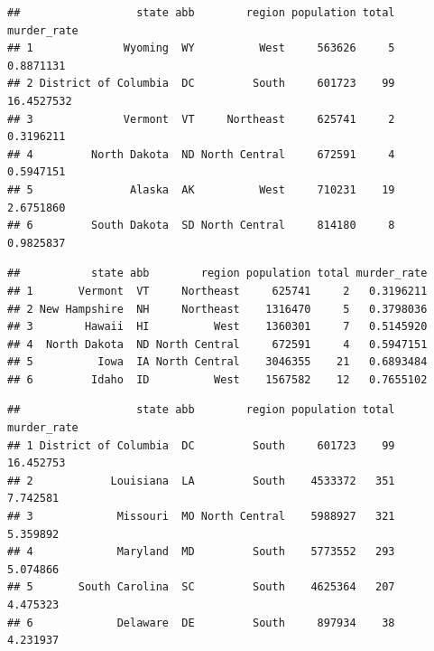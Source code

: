 \documentclass[
]{article}
\newenvironment{Shaded}{\begin{snugshade}}{\end{snugshade}}
\newcommand{\CommentTok}[1]{\textcolor[rgb]{0.56,0.35,0.01}{\textit{#1}}}
\newcommand{\KeywordTok}[1]{\textcolor[rgb]{0.13,0.29,0.53}{\textbf{#1}}}
\newcommand{\NormalTok}[1]{#1}
\newcommand{\OperatorTok}[1]{\textcolor[rgb]{0.81,0.36,0.00}{\textbf{#1}}}
\newcommand{\StringTok}[1]{\textcolor[rgb]{0.31,0.60,0.02}{#1}}
\begin{document}
\begin{verbatim}
##                  state abb        region population total murder_rate
## 1              Wyoming  WY          West     563626     5   0.8871131
## 2 District of Columbia  DC         South     601723    99  16.4527532
## 3              Vermont  VT     Northeast     625741     2   0.3196211
## 4         North Dakota  ND North Central     672591     4   0.5947151
## 5               Alaska  AK          West     710231    19   2.6751860
## 6         South Dakota  SD North Central     814180     8   0.9825837
\end{verbatim}

\begin{Shaded}
\end{Shaded}

\begin{verbatim}
##           state abb        region population total murder_rate
## 1       Vermont  VT     Northeast     625741     2   0.3196211
## 2 New Hampshire  NH     Northeast    1316470     5   0.3798036
## 3        Hawaii  HI          West    1360301     7   0.5145920
## 4  North Dakota  ND North Central     672591     4   0.5947151
## 5          Iowa  IA North Central    3046355    21   0.6893484
## 6         Idaho  ID          West    1567582    12   0.7655102
\end{verbatim}

\begin{Shaded}
\end{Shaded}

\begin{verbatim}
##                  state abb        region population total murder_rate
## 1 District of Columbia  DC         South     601723    99   16.452753
## 2            Louisiana  LA         South    4533372   351    7.742581
## 3             Missouri  MO North Central    5988927   321    5.359892
## 4             Maryland  MD         South    5773552   293    5.074866
## 5       South Carolina  SC         South    4625364   207    4.475323
## 6             Delaware  DE         South     897934    38    4.231937
\end{verbatim}
\end{document}
